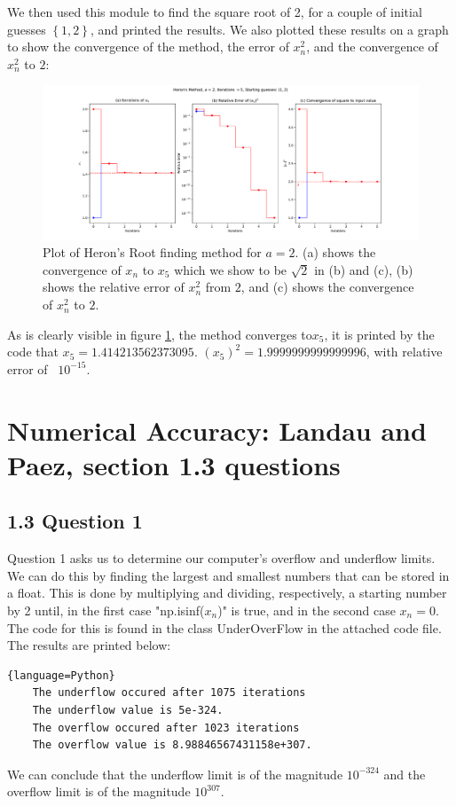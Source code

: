\documentclass{article}
\theoremstyle{definition}
\theoremstyle{remark}
\begin{document}
We then used this module to find the square root of 2, for a couple of initial guesses $\left\{ 1, 2 \right\} $, and printed the results. We also plotted these results on a graph to show the convergence of the method, the error of $x_n^2$, and the convergence of $x_n^2$ to $2$:\\
\hspace{-4cm}
\begin{figure}[H]
    \centering
    \includegraphics[width=1.2\textwidth]{HeronRMF2.pdf}
    \caption{\label{fig:HeronRMF2} Plot of Heron's Root finding method for $a = 2$. (a) shows the convergence of $x_n$ to $x_5$ which we show to be $\sqrt{2}$ in (b) and (c), (b) shows the relative error of $x_n^2$ from $2$, and (c) shows the convergence of $x_n^2$ to $2$.}
\end{figure}
As is clearly visible in figure \ref{fig:HeronRMF2}, the method converges to$x_5$, it is printed by the code that $x_5 = 1.414213562373095$. $(x_5)^2 = 1.9999999999999996$, with relative error of ~$10^{-15}$.

\section{Numerical Accuracy: Landau and Paez, section 1.3 questions}

\subsection{1.3 Question 1}
Question 1 asks us to determine our computer's overflow and underflow limits. We can do this by finding the largest and smallest numbers that can be stored in a float. This is done by multiplying and dividing, respectively, a starting number by 2 until, in the first case "np.isinf($x_n$)" is true, and in the second case $x_n = 0$. The code for this is found in the class UnderOverFlow in the attached code file. The results are printed below:
\begin{lstlisting}{language=Python}
    The underflow occured after 1075 iterations
    The underflow value is 5e-324.
    The overflow occured after 1023 iterations
    The overflow value is 8.98846567431158e+307.
\end{lstlisting}
We can conclude that the underflow limit is of the magnitude $10^{-324}$ and the overflow limit is of the magnitude $10^{307}$.
\end{document}
